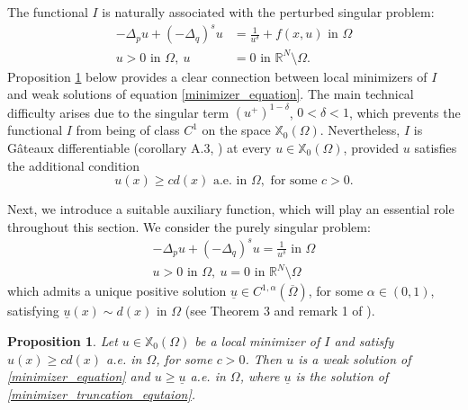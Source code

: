 \documentclass[reqno,oneside]{amsart}
\newtheorem{proposition}[theorem]{Proposition}
\theoremstyle{definition}
\theoremstyle{remark}
\numberwithin{equation}{section}
\newcommand{\Om} {\Omega}
\newcommand{\coa}{C^{1,\alpha}(\overline{\Om})}
\newcommand{\p}{\Delta_p}
\newcommand{\qs}{(-\Delta_q)^s}
\newcommand{\bdry}{\mathbb{R}^N \setminus \Omega}
\newcommand{\xo}{\mathbb{X}_0}
\newcommand{\ul}{\underline{u}}
\begin{document}
The functional $I$ is naturally associated with the perturbed singular problem:
\begin{equation}\label{minimizer_equation}
    \begin{aligned}
        -\p u + \qs u &= \frac{1}{u^{\delta}} + f(x,u) \text{ in } \Om\\
        u>0 \text{ in } \Om,\ u &= 0 \text{ in } \bdry.
    \end{aligned}
\end{equation}
Proposition \ref{minimizer_solution} below provides a clear connection between local minimizers of $I$ and weak solutions of equation \eqref{minimizer_equation}. The main technical difficulty arises due to the singular term $(u^+)^{1-\delta}$, $0<\delta<1$, which prevents the functional $I$ from being of class $C^1$ on the space $\xo (\Om)$. Nevertheless, $I$ is G\^ateaux differentiable (corollary A.3, \cite{giacomoni2007sobolev}) at every $u\in \xo (\Om)$, provided $u$ satisfies the additional condition
\begin{equation}\label{u_greater_than_distance}
    u(x) \geq c d(x) \text{ a.e. in } \Om, \text{ for some } c>0. \nonumber 
\end{equation}

Next, we introduce a suitable auxiliary function, which will play an essential role throughout this section. We consider the purely singular problem:
\begin{equation}\label{minimizer_truncation_equtaion}
    \begin{aligned}
        -\p u + \qs u = \frac{1}{u^{\delta}} \text{ in } \Om\\
        u >0 \text{ in } \Om,\ u = 0 \text{ in } \bdry
    \end{aligned}
\end{equation}
which admits a unique positive solution $\ul\in \coa$, for some $\alpha\in (0,1)$, satisfying $\ul (x) \sim d(x)$ in $\Om$ (see Theorem 3 and remark 1 of \cite{dhanya2026regularity}).

\begin{proposition}\label{minimizer_solution}
    Let $u \in \xo(\Om)$ be a local minimizer of $I$ and satisfy $u(x) \geq c d(x)$ a.e. in $\Om$, for some $c>0$. Then $u$ is a weak solution of \eqref{minimizer_equation} and $u \geq \ul$ a.e. in $\Om$, where $\ul$ is the solution of \eqref{minimizer_truncation_equtaion}.
\end{proposition}
\end{document}
